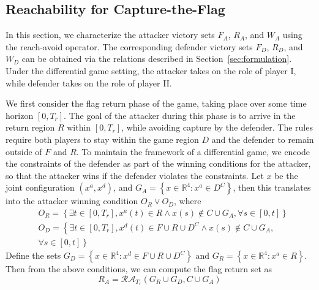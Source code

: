 \documentclass[letterpaper, 10 pt, conference]{ieeeconf}  %
\numberwithin{algorithm}{section}
\begin{document}
\subsection{Reachability for Capture-the-Flag}

In this section, we characterize the attacker victory sets $F_A$, $R_A$, and $W_A$ using the reach-avoid operator.  The corresponding defender victory sets $F_D$, $R_D$, and $W_D$ can be obtained via the relations described in Section~\ref{sec:formulation}.  Under the differential game setting, the attacker takes on the role of player I, while defender takes on the role of player II.   

We first consider the flag return phase of the game, taking place over some time horizon $[0,T_r]$.  The goal of the attacker during this phase is to arrive in the return region $R$ within $[0,T_r]$, while avoiding capture by the defender.  The rules require both players to stay within the game region $D$ and the defender to remain outside of $F$ and $R$.  
To maintain the framework of a differential game, we encode the constraints of the defender as part of the winning conditions for the attacker, so that the attacker wins if the defender violates the constraints.  Let $x$ be the joint configuration $(x^a, x^d)$, and $G_A = \left\{x \in \mathbb{R}^4: x^a \in D^C \right\}$, then this translates into the attacker winning condition $O_R \vee O_D$, where
\begin{align*}
&O_R = \left\{\exists t \in [0,T_r], x^a(t) \in R \wedge x(s) \notin C \cup G_A, \forall s \in [0,t]\right\} \\
&O_D = \left\{\exists t \in [0,T_r], x^d(t) \in F \cup R \cup D^C \wedge x(s) \notin C \cup G_A, \right. \\
&\left. \forall s \in [0,t]\right\}
\end{align*}
Define the sets $G_D = \left\{x \in \mathbb{R}^4: x^d \in F \cup R \cup D^C \right\}$ and $G_R = \left\{x \in \mathbb{R}^4: x^a \in R \right\}$.  Then from the above conditions, we can compute the flag return set as
\begin{equation}
R_A = \mathcal{RA}_{T_r}(G_R \cup G_D, C \cup G_A)
\end{equation}
\end{document}
